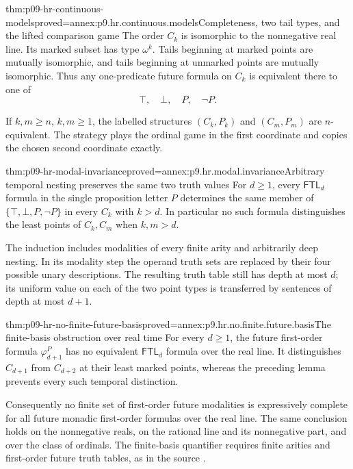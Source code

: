 \begin{hblemma}{thm:p09-hr-continuous-models}{proved=annex:p9.hr.continuous.models}{Completeness, two tail types, and the lifted comparison game}
The order \(C_k\) is isomorphic to the nonnegative real line.
Its marked subset has type \(\omega^k\). Tails beginning at
marked points are mutually isomorphic, and tails beginning
at unmarked points are mutually isomorphic. Thus any
one-predicate future formula on \(C_k\) is equivalent
there to one of
\[
                              \top,\quad\bot,\quad P,\quad\neg P.
\]

If \(k,m\geq n\), \(k,m\geq1\), the labelled structures
\((C_k,P_k)\) and \((C_m,P_m)\) are \(n\)-equivalent.
The strategy plays the ordinal game in the first coordinate
and copies the chosen second coordinate exactly.
\end{hblemma}

\begin{hblemma}{thm:p09-hr-modal-invariance}{proved=annex:p9.hr.modal.invariance}{Arbitrary temporal nesting preserves the same two truth values}
For \(d\geq1\), every \(\mathsf{FTL}_d\) formula in the
single proposition letter \(P\) determines the same member
of \(\{\top,\bot,P,\neg P\}\) in every \(C_k\) with \(k>d\).
In particular no such formula distinguishes the least points
of \(C_k,C_m\) when \(k,m>d\).

The induction includes modalities of every finite arity and
arbitrarily deep nesting. In its modality step the operand
truth sets are replaced by their four possible unary
descriptions. The resulting truth table still has depth
at most \(d\); its uniform value on each of the two point
types is transferred by sentences of depth at most \(d+1\).
\end{hblemma}

\begin{hbtheorem}{thm:p09-hr-no-finite-future-basis}{proved=annex:p9.hr.no.finite.future.basis}{The finite-basis obstruction over real time}
For every \(d\geq1\), the future first-order formula
\(\varphi_{d+1}^{P}\) has no equivalent
\(\mathsf{FTL}_d\) formula over the real line.
It distinguishes \(C_{d+1}\) from \(C_{d+2}\) at their
least marked points, whereas the preceding lemma prevents
every such temporal distinction.

Consequently no finite set of first-order future modalities
is expressively complete for all future monadic first-order
formulas over the real line. The same conclusion holds on
the nonnegative reals, on the rational line and its
nonnegative part, and over the class of ordinals.
The finite-basis quantifier requires finite arities and
first-order future truth tables, as in the source
\cite[Theorems~3.6, 4.1 and 5.1]{HirshfeldRabinovich2003Future}.
\end{hbtheorem}

